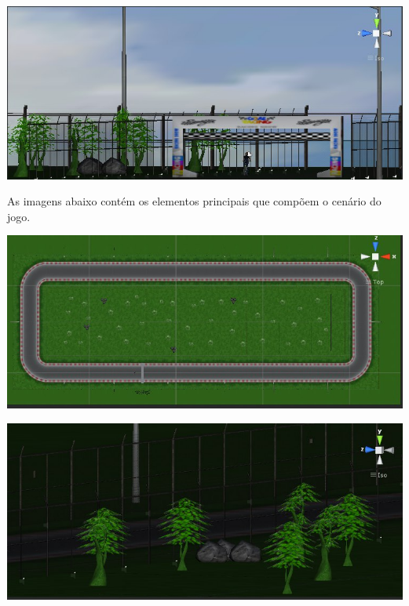 \begin{center}
	\includegraphics[scale=0.4]{figuras/diurno}
	\label{figura:diurno}
\end{center}

As imagens abaixo contém os elementos principais que compõem o cenário do jogo.

\begin{center}
	\includegraphics[scale=0.4]{figuras/pista}
	\label{figura:pista}
\end{center}

\begin{center}
	\includegraphics[scale=0.4]{figuras/jardim}
	\label{figura:jardim}
\end{center}


